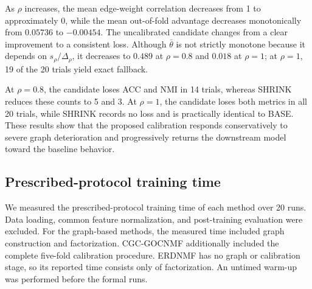 \documentclass[11pt]{article}
\theoremstyle{remark}
\begin{document}
As $\rho$ increases, the mean edge-weight correlation decreases from 1 to approximately 0, while the mean out-of-fold advantage decreases monotonically from $0.05736$ to $-0.00454$. The uncalibrated candidate changes from a clear improvement to a consistent loss. Although $\bar{\theta}$ is not strictly monotone because it depends on
$s_{\rho}/\Delta_{\rho}$, it decreases to $0.489$ at $\rho=0.8$ and
$0.018$ at $\rho=1$; at $\rho=1$, 19 of the 20 trials yield exact
fallback.

At $\rho=0.8$, the candidate loses ACC and NMI in 14 trials, whereas
SHRINK reduces these counts to 5 and 3. At $\rho=1$, the candidate
loses both metrics in all 20 trials, while SHRINK records no loss and
is practically identical to BASE. These results show that the proposed calibration responds conservatively to severe graph deterioration and progressively returns the downstream model toward the baseline behavior.

\subsection{Prescribed-protocol training time}

We measured the prescribed-protocol training time of each method over
20 runs. Data loading, common feature normalization, and post-training evaluation were excluded. For the graph-based methods, the measured time included graph construction and factorization. CGC-GOCNMF additionally included the complete five-fold calibration procedure. ERDNMF has no graph or calibration stage, so its reported time consists only of factorization. An untimed warm-up was performed before the formal runs.
\end{document}
